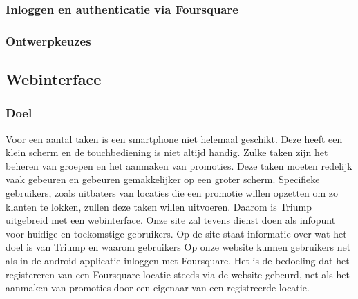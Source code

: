 \subsubsection{Inloggen en authenticatie via Foursquare}

\subsubsection{Ontwerpkeuzes}

\subsection{Webinterface}
\subsubsection{Doel}
Voor een aantal taken is een smartphone niet helemaal geschikt. Deze heeft een klein scherm en de touchbediening is niet altijd handig. Zulke taken zijn het beheren van groepen en het aanmaken van promoties.
Deze taken moeten redelijk vaak gebeuren en gebeuren gemakkelijker op een groter scherm. Specifieke gebruikers, zoals uitbaters van locaties die een promotie willen opzetten om zo klanten te lokken, zullen deze taken willen uitvoeren. Daarom is Triump uitgebreid met een webinterface.
Onze site zal tevens dienst doen als infopunt voor huidige en toekomstige gebruikers. Op de site staat informatie over wat het doel is van Triump en waarom gebruikers
Op onze website kunnen gebruikers net als in de android-applicatie inloggen met Foursquare. Het is de bedoeling dat het registereren van een Foursquare-locatie steeds via de website gebeurd, net als het aanmaken van promoties door een eigenaar van een registreerde locatie.
